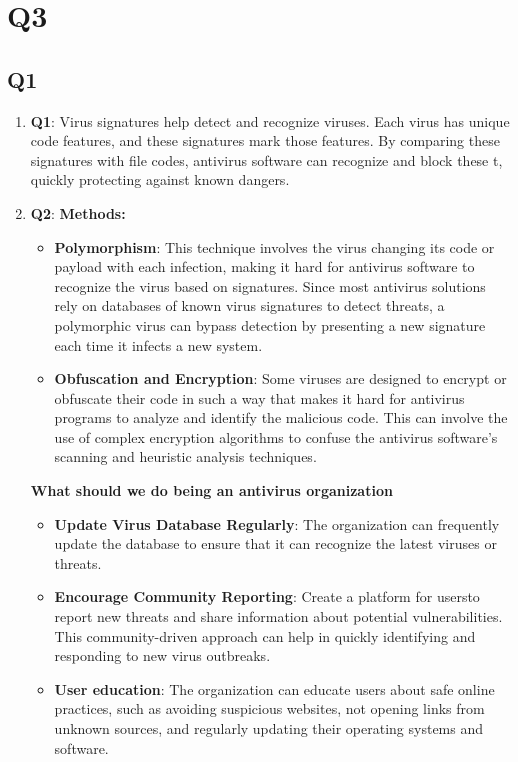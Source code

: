 \documentclass{article}
\begin{document}
\section{Q3}

\subsection{Q1}
	\begin{enumerate}
		\item \textbf{Q1}:
		Virus signatures help detect and recognize viruses\cite{Lenovo2023VirusSignature}. Each virus has unique code features, and these signatures mark those features. By comparing these signatures with file codes, antivirus software can recognize and block these t, quickly protecting against known dangers.

		\item \textbf{Q2}:
		\textbf{Methods:}
			\begin{itemize}
				\item \textbf{Polymorphism}: This technique involves the virus changing its code or payload with each infection, making it hard for antivirus software to recognize the virus based on signatures. Since most antivirus solutions rely on databases of known virus signatures to detect threats, a polymorphic virus can bypass detection by presenting a new signature each time it infects a new system\cite{7740362}.

				\item \textbf{Obfuscation and Encryption}: Some viruses are designed to encrypt or obfuscate their code in such a way that makes it hard for antivirus programs to analyze and identify the malicious code. This can involve the use of complex encryption algorithms to confuse the antivirus software's scanning and heuristic analysis techniques\cite{10.1007/978-3-642-17569-5_39}.

			\end{itemize}

		\textbf{What should we do being an antivirus organization}
			\begin{itemize}
				\item \textbf{Update Virus Database Regularly}: The organization can frequently update the database to ensure that it can recognize the latest viruses or threats.

				\item \textbf{Encourage Community Reporting}: Create a platform for usersto report new threats and share information about potential vulnerabilities. This community-driven approach can help in quickly identifying and responding to new virus outbreaks.

				\item \textbf{User education}: The organization can educate users about safe online practices, such as avoiding suspicious websites, not opening links from unknown sources, and regularly updating their operating systems and software. 
			\end{itemize}
	\end{enumerate}
\end{document}
